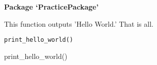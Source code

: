 \documentclass[a4paper]{book}
\begin{document}
\chapter*{}
\begin{center}
{\textbf{\huge Package `PracticePackage'}}
\par\bigskip{\large \today}
\end{center}
\begin{description}
\raggedright{}
\item[Title]
\item[Version]
\item[Description]
\item[Depends]
\item[License]
\item[Encoding]
\item[LazyData]
\item[RoxygenNote]
\item[Suggests]
\end{description}
%
\begin{Description}\relax
This function outputs 'Hello World.' That is all.
\end{Description}
%
\begin{Usage}
\begin{verbatim}
print_hello_world()
\end{verbatim}
\end{Usage}
%
\begin{Examples}
\begin{ExampleCode}
print_hello_world()
\end{ExampleCode}
\end{Examples}
\printindex{}
\end{document}
